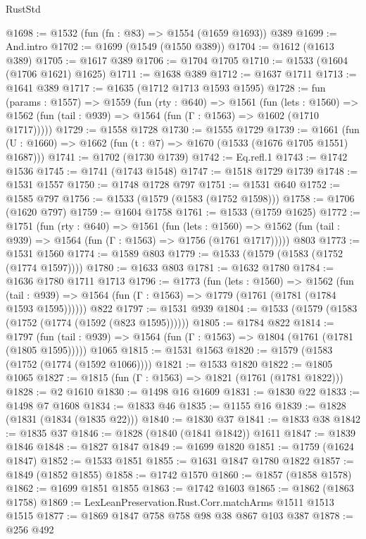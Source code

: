 \begin{lexlean}{RustStd}
\begin{coremodule}
@1698 := @1532 (fun (fn : @83) => @1554 (@1659 @1693)) @389
@1699 := And.intro
@1702 := @1699 (@1549 (@1550 @389))
@1704 := @1612 (@1613 @389)
@1705 := @1617 @389
@1706 := @1704 @1705
@1710 := @1533 (@1604 (@1706 @1621) @1625)
@1711 := @1638 @389
@1712 := @1637 @1711
@1713 := @1641 @389
@1717 := @1635 (@1712 @1713 @1593 @1595)
@1728 := fun (params : @1557) =>
  @1559
    (fun (rty : @640) =>
    @1561
      (fun (lets : @1560) =>
      @1562 (fun (tail : @939) => @1564 (fun (Γ : @1563) => @1602 (@1710 @1717)))))
@1729 := @1558 @1728
@1730 := @1555 @1729
@1739 := @1661 (fun (U : @1660) => @1662 (fun (t : @7) => @1670 (@1533 (@1676 @1705 @1551) @1687)))
@1741 := @1702 (@1730 @1739)
@1742 := Eq.refl.{1}
@1743 := @1742 @1536
@1745 := @1741 (@1743 @1548)
@1747 := @1518 @1729 @1739
@1748 := @1531 @1557
@1750 := @1748 @1728 @797
@1751 := @1531 @640
@1752 := @1585 @797
@1756 := @1533 (@1579 (@1583 (@1752 @1598)))
@1758 := @1706 (@1620 @797)
@1759 := @1604 @1758
@1761 := @1533 (@1759 @1625)
@1772 := @1751
    (fun (rty : @640) =>
    @1561
      (fun (lets : @1560) =>
      @1562 (fun (tail : @939) => @1564 (fun (Γ : @1563) => @1756 (@1761 @1717)))))
    @803
@1773 := @1531 @1560
@1774 := @1589 @803
@1779 := @1533 (@1579 (@1583 (@1752 (@1774 @1597))))
@1780 := @1633 @803
@1781 := @1632 @1780
@1784 := @1636 @1780 @1711 @1713
@1796 := @1773
    (fun (lets : @1560) =>
    @1562
      (fun (tail : @939) => @1564 (fun (Γ : @1563) => @1779 (@1761 (@1781 (@1784 @1593 @1595))))))
    @822
@1797 := @1531 @939
@1804 := @1533 (@1579 (@1583 (@1752 (@1774 (@1592 (@823 @1595))))))
@1805 := @1784 @822
@1814 := @1797
    (fun (tail : @939) => @1564 (fun (Γ : @1563) => @1804 (@1761 (@1781 (@1805 @1595)))))
    @1065
@1815 := @1531 @1563
@1820 := @1579 (@1583 (@1752 (@1774 (@1592 @1066))))
@1821 := @1533 @1820
@1822 := @1805 @1065
@1827 := @1815 (fun (Γ : @1563) => @1821 (@1761 (@1781 @1822)))
@1828 := @2 @1610
@1830 := @1498 @16 @1609
@1831 := @1830 @22
@1833 := @1498 @7 @1608
@1834 := @1833 @46
@1835 := @1155 @16
@1839 := @1828 (@1831 (@1834 (@1835 @22)))
@1840 := @1830 @37
@1841 := @1833 @38
@1842 := @1835 @37
@1846 := @1828 (@1840 (@1841 @1842)) @1611
@1847 := @1839 @1846
@1848 := @1827 @1847
@1849 := @1699 @1820
@1851 := @1759 (@1624 @1847)
@1852 := @1533 @1851
@1855 := @1631 @1847 @1780 @1822
@1857 := @1849 (@1852 @1855)
@1858 := @1742 @1570
@1860 := @1857 (@1858 @1578)
@1862 := @1699 @1851 @1855
@1863 := @1742 @1603
@1865 := @1862 (@1863 @1758)
@1869 := LexLeanPreservation.Rust.Corr.matchArms @1511 @1513 @1515
@1877 := @1869 @1847 @758 @758 @98 @38 @867 @103 @387
@1878 := @256 @492

\end{coremodule}
\end{lexlean}

